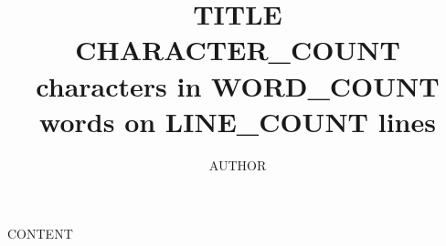 \documentclass[8pt, twocolumn]{article}
\title{TITLE \\ \vspace{6pt}	\small{CHARACTER_COUNT characters in WORD_COUNT words on LINE_COUNT lines}}
\author{AUTHOR}
\begin{document}
	\maketitle
		
	CONTENT
		
\end{document}
